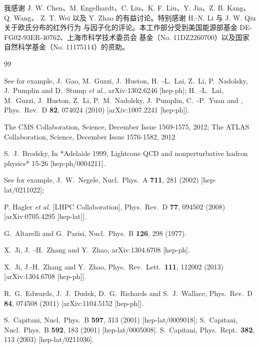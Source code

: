
我感谢 J. W. Chen、M. Engelhardt、C. Liu、K. F. Liu、Y. Jia、Z. B. Kang、Q. Wang、
Z. T. Wei 以及 Y. Zhao 的有益讨论。特别感谢 H.-N. Li 与 J. W. Qiu 关于欧氏分布的红外行为
与因子化的评论。本工作部分受到美国能源部基金 DE-FG02-93ER-40762、上海市科学技术委员会
基金（No. 11DZ2260700）以及国家自然科学基金（No. 11175114）的资助。

\begin{thebibliography}{99}

See for example,
  J.~Gao, M.~Guzzi, J.~Huston, H.~-L.~Lai, Z.~Li, P.~Nadolsky, J.~Pumplin and D.~Stump {\it et al.},
  arXiv:1302.6246 [hep-ph];
  H.~-L.~Lai, M.~Guzzi, J.~Huston, Z.~Li, P.~M.~Nadolsky, J.~Pumplin, C.~-P.~Yuan and ,
  Phys.\ Rev.\ D {\bf 82}, 074024 (2010)
  [arXiv:1007.2241 [hep-ph]].

The CMS Collaboration, Science,  December Issue 1569-1575, 2012;
The ATLAS Collaboration, Science, December Issue 1576-1582, 2012

  S.~J.~Brodsky,
  In *Adelaide 1999, Lightcone QCD and nonperturbative hadron physics* 15-26
  [hep-ph/0004211].

See for example,
  J.~W.~Negele,
  Nucl.\ Phys.\ A {\bf 711}, 281 (2002)
  [hep-lat/0211022];

  P. Hagler {\it et al.}  [LHPC Collaboration],
  Phys.\ Rev.\ D {\bf 77}, 094502 (2008)
  [arXiv:0705.4295 [hep-lat]].


  G.~Altarelli and G.~Parisi,
  Nucl.\ Phys.\ B {\bf 126}, 298 (1977).


  X.~Ji, J.~-H.~Zhang and Y.~Zhao,
  arXiv:1304.6708 [hep-ph].

  X.~Ji, J.-H.~Zhang and Y.~Zhao,
  Phys.\ Rev.\ Lett.\  {\bf 111}, 112002 (2013)
  [arXiv:1304.6708 [hep-ph]].


  R.~G.~Edwards, J.~J.~Dudek, D.~G.~Richards and S.~J.~Wallace,
  Phys.\ Rev.\ D {\bf 84}, 074508 (2011)
  [arXiv:1104.5152 [hep-ph]].


  S.~Capitani,
  Nucl.\ Phys.\ B {\bf 597}, 313 (2001)
  [hep-lat/0009018];
  S.~Capitani,
  Nucl.\ Phys.\ B {\bf 592}, 183 (2001)
  [hep-lat/0005008].
  S.~Capitani,
  Phys.\ Rept.\  {\bf 382}, 113 (2003)
  [hep-lat/0211036].


\end{thebibliography}
